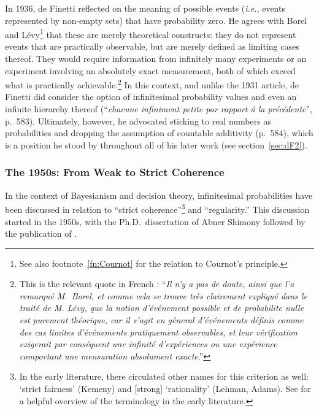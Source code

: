 In 1936, de Finetti reflected on the meaning of possible events (\textit{i.e.}, events represented by non-empty sets) that have probability zero. He agrees with Borel and L{\'e}vy\footnote{See also footnote~\ref{fn:Cournot} for the relation to Cournot's principle.} that these are merely theoretical constructs: they do not represent events that are practically observable, but are merely defined as limiting cases thereof. They would require information from infinitely many experiments or an experiment involving an absolutely exact measurement, both of which exceed what is practically achievable.\footnote{This is the relevant quote in French \citep[p.~577]{deFinetti:1936}: ``\textit{Il n'y a pas de doute, ainsi que l'a remarqu\'{e} M.\ Borel, et comme cela se trouve tr\`{e}s clairement expliqu\'{e} dans le trait\'{e} de M. L\'{e}vy, que la notion d'\'{e}v\'{e}nement possible et de probabilite nulle est purement th\'{e}orique, car il s'agit en g\'{e}neral d'\'{e}v\'{e}nements d\'{e}finis comme des cas limites d'\'{e}v\'{e}nements pratiquement observables, et leur v\'{e}rification exigerait par cons\'{e}quent une \emph{infinit\'{e}} d'exp\'{e}riences ou une exp\'{e}rience comportant une mensuration absolument \emph{exacte}}.''}
In this context, and unlike the 1931 article, de Finetti did consider the option of infinitesimal probability values and even an infinite hierarchy thereof (``\textit{chacune infiniment petite par rapport \'{a} la pr\'{e}c\'{e}dente}'', p.~583). Ultimately, however, he advocated sticking to real numbers as probabilities and dropping the assumption of countable additivity (p.~584), which is a position he stood by throughout all of his later work (see section~\ref{sec:dF2}).

\subsubsection*{The 1950s: From Weak to Strict Coherence}\label{sec:coherence}
In the context of Bayesianism and decision theory, infinitesimal probabilities have been discussed in relation to ``strict coherence''\footnote{In the early literature, there circulated other names for this criterion as well: `strict fairness' (Kemeny) and [strong] `rationality' (Lehman, Adams). See \citet[p.~114]{Carnap:1971b} for a helpful overview of the terminology in the early literature.} and ``regularity.'' This discussion started in the 1950s, with the Ph.D.\ dissertation of Abner Shimony followed by the publication of \citet{Shimony:1955}.

